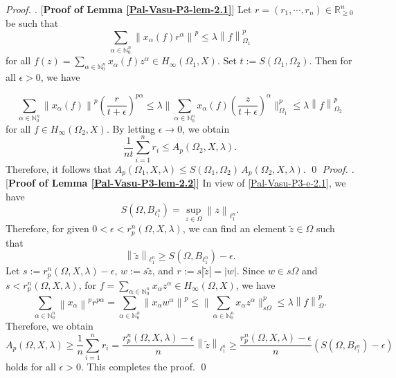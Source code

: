 \documentclass[a4paper,12pt]{amsart}
\theoremstyle{definition}
\newenvironment{pf}[1][]{%
 \vskip 3mm
 \noindent
 \ifthenelse{\equal{#1}{}}%
  {{\slshape Proof. }}%
  {{\slshape #1.} }%
 }%
{\qed\bigskip}
\newcommand{\norm}[1]{\left\lVert#1\right\rVert}
\begin{document}
\begin{pf} [{\bf Proof of Lemma \ref{Pal-Vasu-P3-lem-2.1}}]
	Let $r=(r_1, \cdots, r_n)\in \mathbb{R}^n_{\geq 0}$ be such that 
	\begin{equation*}
		\sum_{\alpha\in \mathbb{N}^n_{0}} \norm{x_{\alpha}(f)r^{\alpha}}^p\leq \lambda
		\norm{f}^p_{\Omega_1}
	\end{equation*}
	for all $f(z)=\sum_{\alpha\in \mathbb{N}^n_{0}}x_{\alpha}(f)z^{\alpha}\in H_{\infty}(\Omega_{1}, X)$. Set $t:= S(\Omega_{1}, \Omega_{2})$. Then for all $\epsilon >0$, we have 
	
	\begin{equation*}
		\sum_{\alpha\in \mathbb{N}^n_{0}}\norm{x_{\alpha}(f)}^p\left(\frac{r}{t+\epsilon}\right)^{p\alpha
		}\leq \lambda \bigg\|\sum_{\alpha\in \mathbb{N}^n_{0}}x_{\alpha}(f)\left(\frac{z}{t+\epsilon}\right)^{\alpha}\bigg\|^p_{\Omega_{1}} \leq \lambda \norm{f}^p_{\Omega_{2}}
	\end{equation*}
	for all $f\in H_{\infty}(\Omega_{2}, X).$ By letting $\epsilon \rightarrow 0$, we obtain 
	\begin{equation*}
		\frac{1}{nt}\sum_{i=1}^{n}r_i \leq A_p(\Omega_{2}, X, \lambda).
	\end{equation*}
	Therefore, it follows that $	A_p(\Omega_{1},X, \lambda) \leq S(\Omega_{1}, \Omega_{2})\, A_p(\Omega_{2}, X, \lambda).$
\end{pf}
\begin{pf} [{\bf Proof of Lemma \ref{Pal-Vasu-P3-lem-2.2}}]
In view of \eqref{Pal-Vasu-P3-e-2.1}, we have 
	\begin{equation*}
		S(\Omega, B_{\ell^n_{1}})=\sup_{z\in \Omega}\norm{z}_{\ell^n_{1}}.
	\end{equation*}
	Therefore, for given $0<\epsilon<r^n_p(\Omega,X,\lambda)$, we can find an element $\tilde{z}\in \Omega$ such that 
	\begin{equation*}
		\norm{\tilde{z}}_{\ell^n_1}\geq S(\Omega, B_{\ell^n_{1}})-\epsilon.
	\end{equation*}
	Let $s:=r^n_p(\Omega,X,\lambda)-\epsilon$, $w:=s\tilde{z}$, and $r:=s|\tilde{z}|=|w|.$ Since $w\in s\Omega$ and $s<r^n_p(\Omega,X,\lambda)$, for $f=\sum_{\alpha\in \mathbb{N}^n_{0}}x_{\alpha}z^{\alpha}\in H_{\infty}(\Omega, X)$, we have
	\begin{equation*}
		\sum_{\alpha\in \mathbb{N}^n_{0}}\norm{x_{\alpha}}^p r^{p\alpha}=\sum_{\alpha\in \mathbb{N}^n_{0}}\norm{x_{\alpha}w^{\alpha}}^p\leq \bigg\|\sum_{\alpha\in \mathbb{N}^n_{0}}x_{\alpha}z^{\alpha}\bigg\|^p_{s\Omega}\leq \lambda\norm{f}^p_{\Omega}.
	\end{equation*}
	Therefore, we obtain 
	\begin{equation*}
		A_p(\Omega, X,\lambda) \geq \frac{1}{n}\sum_{i=1}^{n}r_i = \frac{r^n_p(\Omega,X,\lambda)-\epsilon}{n}\norm{\tilde{z}}_{\ell^n_{1}}\geq \frac{r^n_p(\Omega,X,\lambda)-\epsilon}{n}\left(S(\Omega, B_{\ell^n_{1}})-\epsilon\right)
	\end{equation*}
	holds for all $\epsilon>0.$ This completes the proof.
\end{pf}
\end{document}
